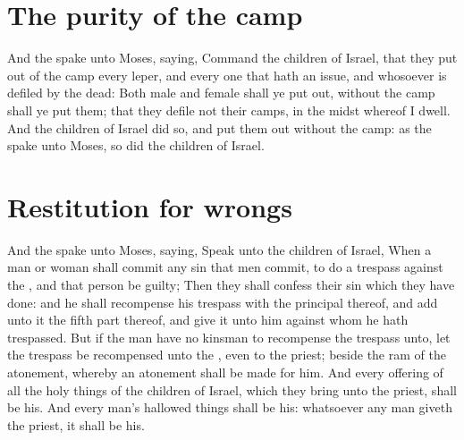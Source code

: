 \section*{The purity of the camp}
\begin{biblechapter} %
\verse And the \LORD spake unto Moses, saying,
\verse Command the children of Israel, that they put out of the camp every leper, and every one that hath an issue, and whosoever is defiled by the dead:
\verse Both male and female shall ye put out, without the camp shall ye put them; that they defile not their camps, in the midst whereof I dwell.
\verse And the children of Israel did so, and put them out without the camp: as the \LORD spake unto Moses, so did the children of Israel.
\section*{Restitution for wrongs}
\verse And the \LORD spake unto Moses, saying,
\verse Speak unto the children of Israel, When a man or woman shall commit any sin that men commit, to do a trespass against the \LORD, and that person be guilty;
\verse Then they shall confess their sin which they have done: and he shall recompense his trespass with the principal thereof, and add unto it the fifth part thereof, and give it unto him against whom he hath trespassed.
\verse But if the man have no kinsman to recompense the trespass unto, let the trespass be recompensed unto the \LORD, even to the priest; beside the ram of the atonement, whereby an atonement shall be made for him.
\verse And every offering of all the holy things of the children of Israel, which they bring unto the priest, shall be his.
\verse And every man's hallowed things shall be his: whatsoever any man giveth the priest, it shall be his.

\end{biblechapter}
